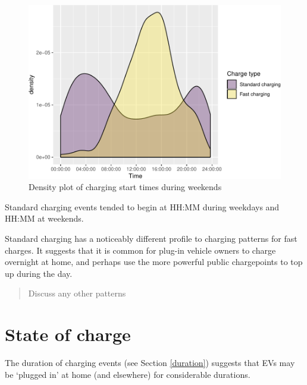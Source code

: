 \documentclass[]{article}
\begin{document}
\begin{figure}
\centering
\includegraphics{EVBB_SummaryReport_files/figure-latex/chargeBeginsWeekend-1.pdf}
\caption{\label{fig:chargeBeginsWeekend}Density plot of charging start times
during weekends}
\end{figure}

Standard charging events tended to begin at HH:MM during weekdays and
HH:MM at weekends.

Standard charging has a noticeably different profile to charging
patterns for fast charges. It suggests that it is common for plug-in
vehicle owners to charge overnight at home, and perhaps use the more
powerful public chargepoints to top up during the day.

\begin{quote}
Discuss any other patterns
\end{quote}

\section{State of charge}\label{state-of-charge}

The duration of charging events (see Section \ref{duration}) suggests
that EVs may be `plugged in' at home (and elsewhere) for considerable
durations.
\end{document}
